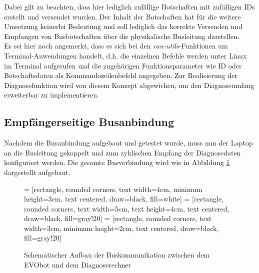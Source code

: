 Dabei gilt zu beachten, dass hier lediglich zufällige Botschaften mit zufälligen IDs erstellt und versendet wurden. Der Inhalt der Botschaften hat für die weitere Umsetzung keinerlei Bedeutung und soll lediglich das korrekte Versenden und Empfangen von Busbotschaften über die physikalische Busleitung darstellen.\\
Es sei hier noch angemerkt, dass es sich bei den \emph{can-utils}-Funktionen um Terminal-Anwendungen handelt, d.h. die einzelnen Befehle werden unter Linux im Terminal aufgerufen und die zugehörigen Funktionsparameter wie ID oder Botschaftsdaten als Kommandozeilenbefehl angegeben. Zur Realisierung der Diagnosefunktion wird von diesem Konzept abgewichen, um den Diagnoseumfang erweiterbar zu implementieren.


\subsection{Empfängerseitige Busanbindung}
Nachdem die Busanbindung aufgebaut und getestet wurde, muss nun der Laptop an die Busleitung gekoppelt und zum zyklischen Empfang der Diagnosedaten konfiguriert werden. Die gesamte Busverbindung wird wie in Abbildung \ref{abb:AufbauBuskommunikation} dargestellt aufgebaut. 

\begin{figure}[!htbp]
	\centering
	 = [rectangle, rounded corners, text width=4cm, minimum height=3cm, text centered, draw=black, fill=white]
	 = [rectangle, rounded corners, text width=5cm, text height=4cm, text centered, draw=black, fill=gray!20]
	 = [rectangle, rounded corners, text width=3cm, minimum height=2cm, text centered, draw=black, fill=gray!20]
	\caption{Schematischer Aufbau der Buskommunikation zwischen dem EVObot und dem Diagnoserechner}
	\label{abb:AufbauBuskommunikation}
\end{figure}

